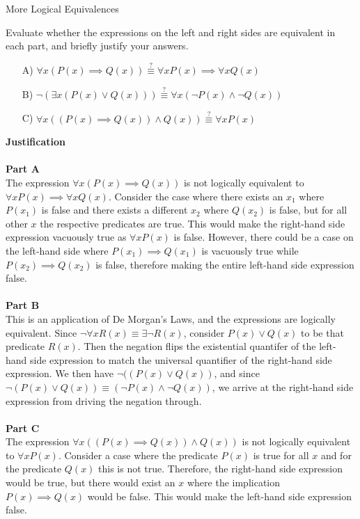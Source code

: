 \begin{homeworkProblem}{More Logical Equivalences}

    Evaluate whether the expressions on the left and right sides are equivalent in each part, and briefly justify your answers.

    \begin{itemize}
        \item[A)] $\forall x (P(x) \implies Q(x)) \overset{?}{\equiv} \forall x P(x) \implies \forall x Q(x)$
        \item[B)] $\neg (\exists x (P(x) \vee Q(x))) \overset{?}{\equiv} \forall x (\neg P(x) \wedge \neg Q(x))$
        \item[C)] $\forall x ((P(x) \implies Q(x)) \wedge Q(x)) \overset{?}{\equiv} \forall x P(x)$ 
    \end{itemize}

    \textbf{Justification}
    \\ \\
    \textbf{Part A} \\
    The expression $\forall x (P(x) \implies Q(x))$ is not logically equivalent to $\forall x P(x) \implies \forall x Q(x)$. Consider the case where there exists an $x_1$ where $P(x_1)$ is false and there exists a different $x_2$ where $Q(x_2)$ is false, but for all other $x$ the respective predicates are true. This would make the right-hand side expression vacuously true as $\forall x P(x)$ is false. However, there could be a case on the left-hand side where $P(x_1) \implies Q(x_1)$ is vacuously true while $P(x_2) \implies Q(x_2)$ is false, therefore making the entire left-hand side expression false. 
    \\ \\
    \textbf{Part B} \\
    This is an application of De Morgan's Laws, and the expressions are logically equivalent. Since $\neg \forall x R(x) \equiv \exists \neg R(x)$, consider $P(x) \vee Q(x)$ to be that predicate $R(x)$. Then the negation flips the existential quantifer of the left-hand side expression to match the universal quantifier of the right-hand side expression. We then have $\neg ((P(x) \vee Q(x))$, and since $\neg (P(x) \vee Q(x)) \equiv (\neg P(x) \wedge \neg Q(x))$, we arrive at the right-hand side expression from driving the negation through.
    \\ \\
    \textbf{Part C} \\
    The expression $\forall x ((P(x) \implies Q(x)) \wedge Q(x))$ is not logically equivalent to $\forall x P(x)$. Consider a case where the predicate $P(x)$ is true for all $x$ and for the predicate $Q(x)$ this is not true. Therefore, the right-hand side expression would be true, but there would exist an $x$ where the implication $P(x) \implies Q(x)$ would be false. This would make the left-hand side expression false. 
    
\end{homeworkProblem}